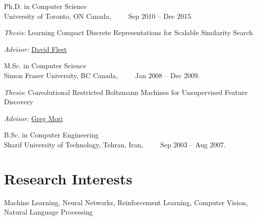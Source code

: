 \documentclass[10pt,letterpaper]{article}
\renewenvironment{itemize}{
  \begin{list}{}{
    \setlength{\leftmargin}{1.5em}
  }
}{
  \end{list}
}
\begin{document}
\begin{itemize}
  \item Ph.D. in Computer Science\\
    University of Toronto, ON Canada,~~~~~Sep 2010 -- Dec 2015.
    \begin{itemize}
    \item \textit{Thesis:} Learning Compact Discrete Representations for
Scalable Similarity Search
    \item \textit{Advisor:} \href{http://www.cs.toronto.edu/~fleet/}{David Fleet}
    \end{itemize}

  \item M.Sc. in Computer Science\\
    Simon Fraser University, BC Canada,~~~~~Jan 2008 -- Dec 2009.
    \begin{itemize}
    \item \textit{Thesis:} Convolutional Restricted Boltzmann Machines for Unsupervised Feature Discovery
    \item \textit{Advisor:} \href{http://www.cs.sfu.ca/~mori/}{Greg Mori}%
    \end{itemize}

  \item B.Sc. in Computer Engineering\\
    Sharif University of Technology, Tehran, Iran,~~~~~Sep 2003 -- Aug 2007.
\end{itemize}

\section*{Research Interests}

Machine Learning, Neural Networks, Reinforcement Learning, Computer Vision, Natural Language Processing
\end{document}
